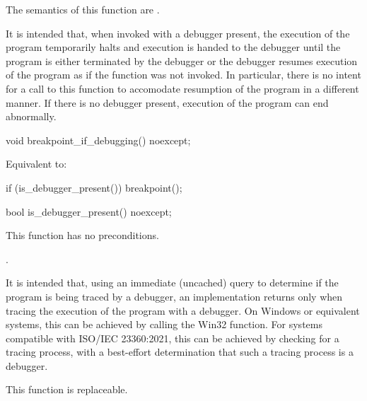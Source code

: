 \begin{itemdescr}

\pnum
The semantics of this function are .

\begin{note}
It is intended that, when invoked with a debugger present, the execution of the
program temporarily halts and execution is handed to the debugger until the
program is either terminated by the debugger or the debugger resumes execution
of the program as if the function was not invoked. In particular, there is no
intent for a call to this function to accomodate resumption of the program in a
different manner. If there is no debugger present, execution of the program can
end abnormally.
\end{note}

\end{itemdescr}

%
\begin{itemdecl}
void breakpoint_if_debugging() noexcept;
\end{itemdecl}

\begin{itemdescr}

\pnum
\effects
Equivalent to:
\begin{codeblock}
if (is_debugger_present()) breakpoint();
\end{codeblock}

\end{itemdescr}

%
\begin{itemdecl}
bool is_debugger_present() noexcept;
\end{itemdecl}

\begin{itemdescr}
\pnum
\required
This function has no preconditions.

\pnum
{}
{}.

\begin{note}
It is intended that, using an immediate (uncached) query to determine if the
program is being traced by a debugger, an implementation returns 
only when tracing the execution of the program with a debugger. On Windows or
equivalent systems, this can be achieved by calling the
 Win32 function. For systems compatible with
ISO/IEC 23360:2021, this can be achieved by checking for a tracing process, with
a best-effort determination that such a tracing process is a debugger.
\end{note}

\pnum
\remarks
This function is replaceable.

\end{itemdescr}
